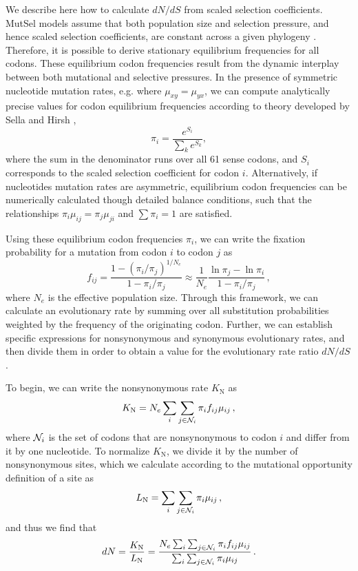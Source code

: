 \documentclass{pnastwo}
\begin{document}
\begin{article}
We describe here how to calculate $dN/dS$ from scaled selection coefficients. MutSel models assume that both population size and selection pressure, and hence scaled selection coefficients, are constant across a given phylogeny \cite{HalpernBruno1998,YangNielsen2008,Rodrigueetal2010,Tamurietal2014}. Therefore, it is possible to derive stationary equilibrium frequencies for all codons. These equilibrium codon frequencies result from the dynamic interplay between both mutational and selective pressures. In the presence of symmetric nucleotide mutation rates, e.g. where $\mu_{xy} = \mu_{yx}$, we can compute analytically precise values for codon equilibrium frequencies according to theory developed by Sella and Hirsh \cite{SellaHirsh2005}, \begin{equation} \pi_i=\frac{e^{S_i}}{\sum_k e^{S_k}}, \end{equation} where the sum in the denominator runs over all 61 sense codons, and $S_i$ corresponds to the scaled selection coefficient for codon $i$. Alternatively, if nucleotides mutation rates are asymmetric, equilibrium codon frequencies can be numerically calculated though detailed balance conditions, such that the relationships 
 $\pi_i\mu_{ij} = \pi_j\mu_{ji}$ and $\sum\pi_i = 1$ are satisfied.
 
Using these equilibrium codon frequencies $\pi_i$, we can write the fixation probability for a mutation from codon $i$ to codon $j$ as \cite{HalpernBruno1998,SellaHirsh2005}
\begin{equation}\label{eq:f_ij}
 f_{ij} = \frac{1-(\pi_i/\pi_j)^{1/N_e}}{1-\pi_i/\pi_j}
  \approx \frac{1}{N_e} \frac{\ln \pi_j - \ln \pi_i}{1-\pi_i/\pi_j}\,,
\end{equation}
where $N_e$ is the effective population size. Through this framework, we can calculate an evolutionary rate by summing over all substitution probabilities weighted by the frequency of the originating codon. Further, we can establish specific expressions for nonsynonymous and synonymous evolutionary rates, and then divide them in order to obtain a value for the evolutionary rate ratio $dN/dS$.

To begin, we can write the nonsynonymous rate $K_\text{N}$ as 
\begin{equation}\label{eq:KN}
  K_\text{N} = N_e \sum_i \sum_{j \in {\cal N}_i} \pi_i  f_{ij}\mu_{ij}\,,
\end{equation}
where ${\cal N}_i$ is the set of codons that are nonsynonymous to codon $i$ and differ from it by one nucleotide. To normalize $K_\text{N}$, we divide it by the number of nonsynonymous sites, which we calculate according to the mutational opportunity definition of a site \cite{GoldmanYang1994, Yang2006} as 
\begin{equation}\label{eq:LN}
  L_\text{N} = \sum_i \sum_{j \in {\cal N}_i} \pi_i \mu_{ij}\,, 
\end{equation} and thus we find that 
\begin{equation}\label{eq:dN}
  dN = \frac{K_\text{N}}{L_\text{N}}=\frac{ N_e \sum_i \sum_{j \in {\cal N}_i} \pi_i f_{ij} \mu_{ij} } {\sum_i \sum_{j \in {\cal N}_i} \pi_i \mu_{ij} }\,.
\end{equation}


\end{article}
\end{document}
